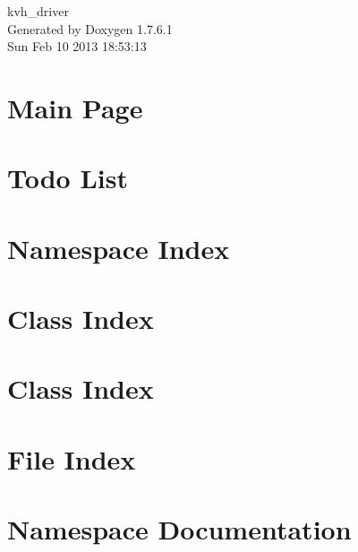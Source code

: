 \documentclass[a4paper]{book}
\begin{document}
\begin{titlepage}
\vspace*{7cm}
\begin{center}
{\Large kvh\-\_\-driver }\\
\vspace*{1cm}
{\large \-Generated by Doxygen 1.7.6.1}\\
\vspace*{0.5cm}
{\small Sun Feb 10 2013 18:53:13}\\
\end{center}
\end{titlepage}
\clearemptydoublepage
{}
\tableofcontents
\clearemptydoublepage
{}
\chapter{\-Main \-Page}
\label{index}
\chapter{\-Todo \-List}
\label{todo}

\chapter{\-Namespace \-Index}

\chapter{\-Class \-Index}

\chapter{\-Class \-Index}

\chapter{\-File \-Index}

\chapter{\-Namespace \-Documentation}








\end{document}
